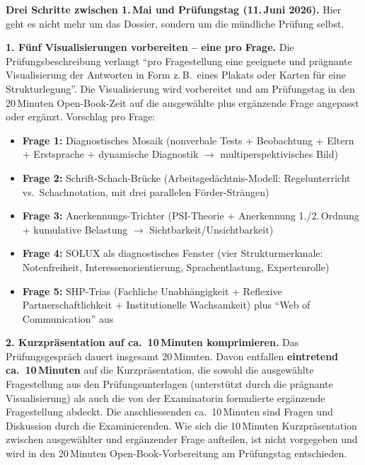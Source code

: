 \documentclass[ngerman, a4paper]{article}
\begin{document}
\begin{todojuni}
\textbf{Drei Schritte zwischen 1.\,Mai und Prüfungstag (11.\,Juni 2026).}
Hier geht es nicht mehr um das Dossier, sondern um die mündliche Prüfung selbst.

\medskip
\textbf{1. Fünf Visualisierungen vorbereiten -- eine pro Frage.}
Die Prüfungsbeschreibung verlangt \enquote{pro Fragestellung eine geeignete und prägnante Visualisierung der Antworten in Form z.\,B.\ eines Plakats oder Karten für eine Strukturlegung}. Die Visualisierung wird vorbereitet und am Prüfungstag in den 20\,Minuten Open-Book-Zeit auf die ausgewählte plus ergänzende Frage angepasst oder ergänzt. Vorschlag pro Frage:
\begin{itemize}\setlength{\itemsep}{0pt}
  \item \textbf{Frage 1:} Diagnostisches Mosaik (nonverbale Tests + Beobachtung + Eltern + Erstsprache + dynamische Diagnostik $\rightarrow$ multiperspektivisches Bild)
  \item \textbf{Frage 2:} Schrift-Schach-Brücke (Arbeitsgedächtnis-Modell: Regelunterricht vs.\ Schachnotation, mit drei parallelen Förder-Strängen)
  \item \textbf{Frage 3:} Anerkennungs-Trichter (PSI-Theorie + Anerkennung 1./2.\,Ordnung + kumulative Belastung $\rightarrow$ Sichtbarkeit/Unsichtbarkeit)
  \item \textbf{Frage 4:} SOLUX als diagnostisches Fenster (vier Strukturmerkmale: Notenfreiheit, Interessenorientierung, Sprachentlastung, Expertenrolle)
  \item \textbf{Frage 5:} SHP-Trias (Fachliche Unabhängigkeit + Reflexive Partnerschaftlichkeit + Institutionelle Wachsamkeit) plus \enquote{Web of Communication} aus \textcite{gubbins2020promising}
\end{itemize}

\medskip
\textbf{2. Kurzpräsentation auf ca.\ 10\,Minuten komprimieren.}
Das Prüfungsgespräch dauert insgesamt 20\,Minuten. Davon entfallen \textbf{eintretend ca.\ 10\,Minuten} auf die Kurzpräsentation, die sowohl die ausgewählte Fragestellung aus den Prüfungsunterlagen (unterstützt durch die prägnante Visualisierung) als auch die von der Examinatorin formulierte ergänzende Fragestellung abdeckt. Die anschliessenden ca.\ 10\,Minuten sind Fragen und Diskussion durch die Examinierenden. Wie sich die 10\,Minuten Kurzpräsentation zwischen ausgewählter und ergänzender Frage aufteilen, ist nicht vorgegeben und wird in den 20\,Minuten Open-Book-Vorbereitung am Prüfungstag entschieden.


\end{todojuni}
\end{document}
